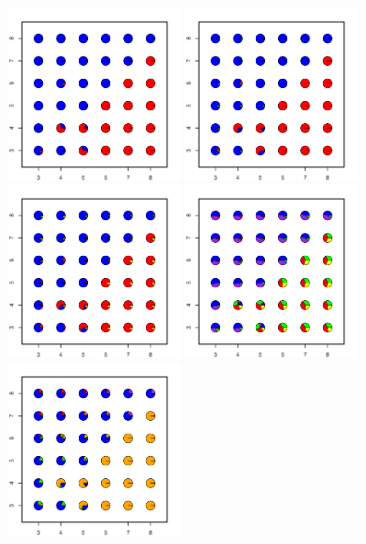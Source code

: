 \documentclass[12pt]{article}
\begin{document}
\newpage
\begin{figure}
	\centering
			{\includegraphics[width=1.8in,height=1.8in]{figs/sims/simK2_nsp_pies_K2.pdf}}
			{\includegraphics[width=1.8in,height=1.8in]{figs/sims/simK2_nsp_pies_K3.pdf}}
			{\includegraphics[width=1.8in,height=1.8in]{figs/sims/simK2_nsp_pies_K4.pdf}}
			{\includegraphics[width=1.8in,height=1.8in]{figs/sims/simK2_nsp_pies_K5.pdf}}
			{\includegraphics[width=1.8in,height=1.8in]{figs/sims/simK2_nsp_pies_K6.pdf}}

\end{figure}
\end{document}
